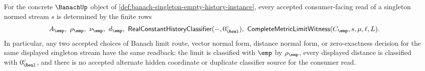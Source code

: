 \begin{corollary}
\label{cor:banach-singleton-empty-history-consumer-determinacy}
For the concrete $\BanachUp$ object of
\autoref{def:banach-singleton-empty-history-instance}, every accepted
consumer-facing read of a singleton normed stream $s$ is determined by the
finite rows
$$
A_{\emp},\ \rho_{\emp},\ \nu_{\emp},\ d_{\emp},\
\mathsf{RealConstantHistoryClassifier}(-,0_{\Real}^{c}),\
\mathsf{CompleteMetricLimitWitness}(C_{\emp},s,\mu,\ell,L).
$$
In particular, any two accepted choices of Banach limit route, vector normal
form, distance normal form, or zero-exactness decision for the same displayed
singleton stream have the same readback: the limit is classified with $\emp$ by
$\rho_{\emp}$, every displayed distance is classified with
$0_{\Real}^{c}$, and there is no accepted alternate hidden coordinate
or duplicate classifier source for the consumer read.
\end{corollary}
